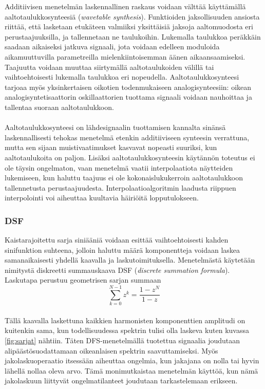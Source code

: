 \documentclass[finnish,12pt,a4paper,pdftex]{article} %
\begin{document}
Additiivisen menetelmän laskennallinen raskaus voidaan välttää käyttämällä aaltotaulukkosynteesiä (\textit{wavetable synthesis}). Funktioiden jaksollisuuden ansiosta riittää, että lasketaan etukäteen valmiiksi yksittäisiä jaksoja aaltomuodosta eri perustaajuuksilla, ja tallennetaan ne taulukoihin. Lukemalla taulukkoa peräkkäin saadaan aikaiseksi jatkuva signaali, jota voidaan edelleen moduloida aikamuuttuvilla parametreilla mielenkiintoisemman äänen aikaansaamiseksi. Taajuutta voidaan muuttaa siirtymällä aaltotaulukoiden välillä tai vaihtoehtoisesti lukemalla taulukkoa eri nopeudella. Aaltotaulukkosynteesi tarjoaa myös yksinkertaisen oikotien todenmukaiseen analogisynteesiin: oikean analogisyntetisaattorin oskillaattorien tuottama signaali voidaan nauhoittaa ja tallentaa suoraan aaltotaulukkoon. \cite{Valimaki2007, Pekonen2014} \\\\
Aaltotaulukkosynteesi on lähdesignaalin tuottamisen kannalta sinänsä laskennallisesti tehokas menetelmä etenkin additiiviseen synteesin verrattuna, mutta sen sijaan muistivaatimukset kasvavat nopeasti suuriksi, kun aaltotaulukoita on paljon. Lisäksi aaltotaulukkosynteesin käytännön toteutus ei ole täysin ongelmaton, vaan menetelmä vaatii interpolaatiota näytteiden lukemiseen, kun haluttu taajuus ei ole kokonaislukukerroin aaltotaulukkoon tallennetusta perustaajuudesta. Interpolaatioalgoritmin laadusta riippuen interpolointi voi aiheuttaa kuultavia häiriöitä lopputulokseen. \cite{Valimaki2007, Pekonen2014, Stilson1996}

\subsubsection{DSF}

Kaistarajoitettu sarja siniääniä voidaan esittää vaihtoehtoisesti kahden sinifunktion suhteena, jolloin haluttu määrä komponentteja voidaan laskea samanaikaisesti yhdellä kaavalla ja laskutoimituksella. Menetelmästä käytetään nimitystä diskreetti summauskaava DSF (\textit{discrete summation formula}). Laskutapa perustuu geometrisen sarjan summaan \cite{Stilson1996, Lowenfels2003}
\begin{equation}
\sum_{k=0}^{N-1}z^k = \frac{1-z^N}{1-z}
\end{equation} \\
Tällä kaavalla laskettuna kaikkien harmonisten komponenttien amplitudi on kuitenkin sama, kun todellisuudessa spektrin tulisi olla laskeva kuten kuvassa \ref{fig:sarjat} nähtiin. Täten DFS-menetelmällä tuotettua signaalia joudutaan alipäästösuodattamaan oikeanlaisen spektrin saavuttamiseksi. Myös jakolaskuoperaatio itsessään aiheuttaa ongelmia, kun jakajana on nolla tai hyvin lähellä nollaa oleva arvo. Tämä monimutkaistaa menetelmän käyttöä, kun nämä jakolaskuun liittyvät ongelmatilanteet joudutaan tarkastelemaan erikseen. \cite{Pekonen2014, Nostalgia}
\end{document}
